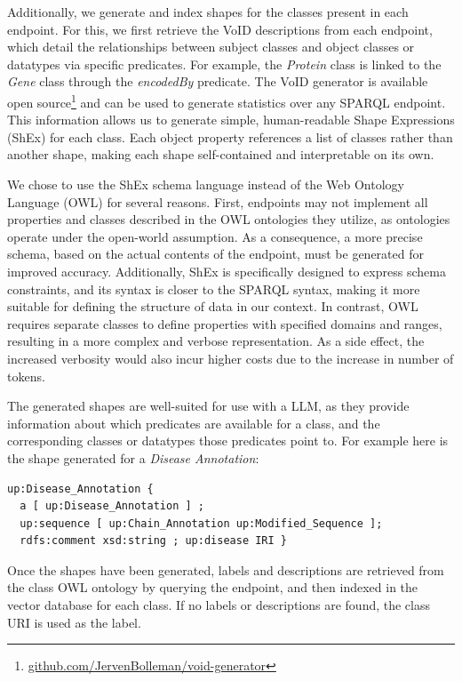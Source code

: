 \documentclass[
]{ceurart}
\begin{document}
Additionally, we generate and index shapes for the classes present in each endpoint. For this, we first retrieve the VoID descriptions from each endpoint, which detail the relationships between subject classes and object classes or datatypes via specific predicates. For example, the \textit{Protein} class is linked to the \textit{Gene} class through the \textit{encodedBy} predicate. The VoID generator is available open source\footnote{\href{https://github.com/JervenBolleman/void-generator}{github.com/JervenBolleman/void-generator}} and can be used to generate statistics over any SPARQL endpoint. This information allows us to generate simple, human-readable Shape Expressions (ShEx) for each class. Each object property references a list of classes rather than another shape, making each shape self-contained and interpretable on its own.

We chose to use the ShEx schema language instead of the Web Ontology Language (OWL) for several reasons. First, endpoints may not implement all properties and classes described in the OWL ontologies they utilize, as ontologies operate under the open-world assumption. As a consequence, a more precise schema, based on the actual contents of the endpoint, must be generated for improved accuracy. Additionally, ShEx is specifically designed to express schema constraints, and its syntax is closer to the SPARQL syntax, making it more suitable for defining the structure of data in our context. In contrast, OWL requires separate classes to define properties with specified domains and ranges, resulting in a more complex and verbose representation. As a side effect, the increased verbosity would also incur higher costs due to the increase in number of tokens.

The generated shapes are well-suited for use with a LLM, as they provide information about which predicates are available for a class, and the corresponding classes or datatypes those predicates point to. For example here is the shape generated for a \textit{Disease Annotation}:

\begin{verbatim}
up:Disease_Annotation {
  a [ up:Disease_Annotation ] ;
  up:sequence [ up:Chain_Annotation up:Modified_Sequence ];
  rdfs:comment xsd:string ; up:disease IRI }
\end{verbatim}

Once the shapes have been generated, labels and descriptions are retrieved from the class OWL ontology by querying the endpoint, and then indexed in the vector database for each class. If no labels or descriptions are found, the class URI is used as the label.
\end{document}
